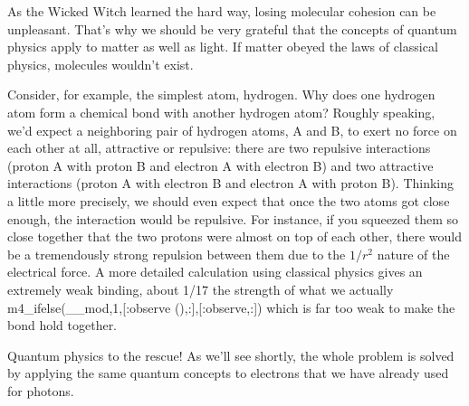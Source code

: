 
As the Wicked Witch learned the hard way, losing molecular
cohesion can be unpleasant. That's why we should be very
grateful that the concepts of quantum physics apply to
matter as well as light. If matter obeyed the laws of
classical physics, molecules wouldn't exist.

Consider, for example, the simplest atom, hydrogen. Why does
one hydrogen atom form a chemical bond with another hydrogen
atom? Roughly speaking, we'd expect a neighboring pair of
hydrogen atoms, A and B, to exert no force on each other
at all, attractive or repulsive: there are two repulsive
interactions (proton A with proton B and electron A with
electron B) and two attractive interactions (proton A with
electron B and electron A with proton B). Thinking a
little more precisely, we should even expect that once the
two atoms got close enough, the interaction would be
repulsive. For instance, if you squeezed them so close
together that the two protons were almost on top of each
other, there would be a tremendously strong repulsion
between them due to the $1/r^2$ nature of the electrical
force. A more detailed calculation using classical physics
gives an extremely weak binding, about 1/17 the strength of
what we actually m4_ifelse(__mod,1,[:observe (),:],[:observe,:]) 
which is far too weak to make the bond hold together.

Quantum physics to the rescue! As we'll see shortly, the
whole problem is solved by applying the same quantum
concepts to electrons that we have already used for photons.

